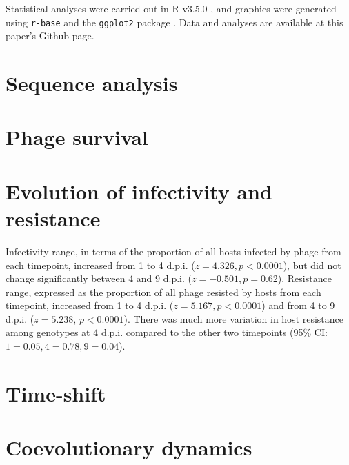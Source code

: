 \documentclass [12pt, a4paper, twoside]  {article}
\begin{document}
Statistical analyses were carried out in R v3.5.0 \citep{R}, and graphics were generated using \texttt{r-base} and the \texttt{ggplot2} package \citep{ggplot2}. Data and analyses are available at this paper's Github page.

\section*{Sequence analysis}


\section*{Phage survival}


\section*{Evolution of infectivity and resistance}
Infectivity range, in terms of the proportion of all hosts infected by phage from each timepoint, increased from 1 to 4 d.p.i. ($z = 4.326, p < 0.0001$), but did not change significantly between 4 and 9 d.p.i. ($z=-0.501, p=0.62$). Resistance range, expressed as the proportion of all phage resisted by hosts from each timepoint, increased from 1 to 4 d.p.i. ($z = 5.167, p < 0.0001$) and from 4 to 9 d.p.i. ($z=5.238$, $p < 0.0001$). There was much more variation in host resistance among genotypes at 4 d.p.i. compared to the other two timepoints (95\% CI: $1=0.05, 4=0.78, 9=0.04$). 

\section*{Time-shift}

\section*{Coevolutionary dynamics}


\clearpage

\end{document}
